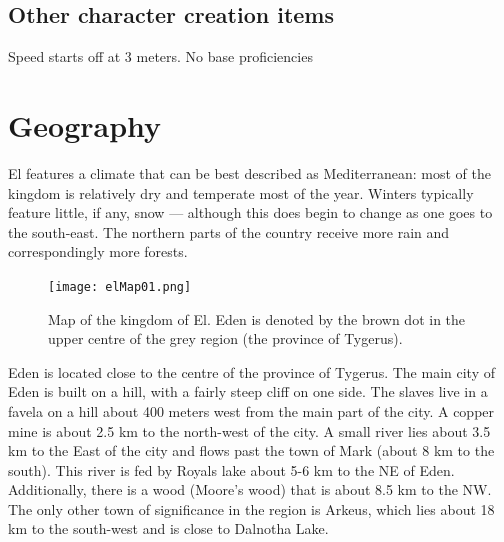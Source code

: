 \documentclass[letterpaper,12pt]{article}
\begin{document}
\subsection{Other character creation items}

Speed starts off at 3 meters. No base proficiencies 

\section{Geography}\label{Geography}

El features a climate that can be best described as Mediterranean: most of the kingdom is relatively dry and temperate most of the year. Winters typically feature little, if any, snow --- although this does begin to change as one goes to the south-east. The northern parts of the country receive more rain and correspondingly more forests.  

\begin{figure}[ht] 
        \centering \texttt{[image: elMap01.png]}
        \caption{Map of the kingdom of El. Eden is denoted by the brown dot in the upper centre of the grey region (the province of Tygerus).}
\end{figure}

Eden is located close to the centre of the province of Tygerus. The main city of Eden is built on a hill, with a fairly steep cliff on one side. The slaves live in a favela on a hill about 400 meters west from the main part of the city. A copper mine is about 2.5 km to the north-west of the city. A small river lies about 3.5 km to the East of the city and flows past the town of Mark (about 8 km to the south). This river is fed by Royals lake about 5-6 km to the NE of Eden. Additionally, there is a wood (Moore's wood) that is about 8.5 km to the NW. The only other town of significance in the region is Arkeus, which lies about 18 km to the south-west and is close to Dalnotha Lake. 
\end{document}
